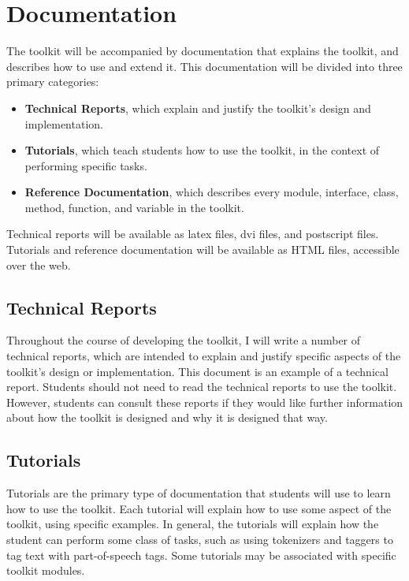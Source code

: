 \documentclass{article}
\begin{document}
\section{Documentation}

The toolkit will be accompanied by documentation that explains the
toolkit, and describes how to use and extend it.  This documentation
will be divided into three primary categories:

\begin{itemize}
  \item \textbf{Technical Reports}, which explain and justify the
  toolkit's design and implementation.

  \item \textbf{Tutorials}, which teach students how to use the
  toolkit, in the context of performing specific tasks.

  \item \textbf{Reference Documentation}, which describes every
  module, interface, class, method, function, and variable in the
  toolkit.
\end{itemize}

Technical reports will be available as latex files, dvi files, and
postscript files.  Tutorials and reference documentation will be
available as HTML files, accessible over the web.

\subsection{Technical Reports}

Throughout the course of developing the toolkit, I will write a number
of technical reports, which are intended to explain and justify
specific aspects of the toolkit's design or implementation.  This
document is an example of a technical report.  Students should not
need to read the technical reports to use the toolkit.  However,
students can consult these reports if they would like further
information about how the toolkit is designed and why it is designed
that way.

\subsection{Tutorials}

Tutorials are the primary type of documentation that students will use
to learn how to use the toolkit.  Each tutorial will explain how to
use some aspect of the toolkit, using specific examples.  In general,
the tutorials will explain how the student can perform some class of
tasks, such as using tokenizers and taggers to tag text with
part-of-speech tags.  Some tutorials may be associated with specific
toolkit modules.
\end{document}

